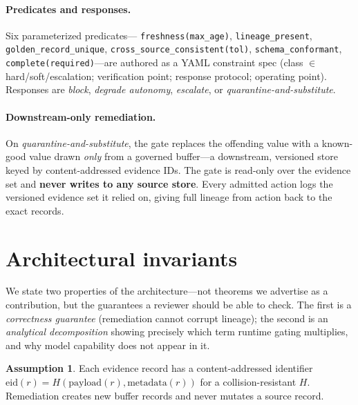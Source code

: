 \documentclass[11pt]{article}
\theoremstyle{plain}
\theoremstyle{definition}
\newtheorem{assumption}{Assumption}
\begin{document}
\paragraph{Predicates and responses.} Six parameterized predicates---%
\texttt{freshness(max\_age)}, \texttt{lineage\_present},
\texttt{golden\_record\_unique}, \texttt{cross\_source\_consistent(tol)},
\texttt{schema\_conformant}, \texttt{complete(required)}---are authored as a YAML
constraint spec (class $\in$ hard/soft/escalation; verification point; response
protocol; operating point). Responses are \emph{block}, \emph{degrade autonomy},
\emph{escalate}, or \emph{quarantine-and-substitute}.

\paragraph{Downstream-only remediation.} On \emph{quarantine-and-substitute}, the
gate replaces the offending value with a known-good value drawn \emph{only} from a
governed buffer---a downstream, versioned store keyed by content-addressed evidence
IDs. The gate is read-only over the evidence set and \textbf{never writes to any
source store}. Every admitted action logs the versioned evidence set it relied on,
giving full lineage from action back to the exact records.

\section{Architectural invariants}\label{sec:formal}
We state two properties of the architecture---not theorems we advertise as a
contribution, but the guarantees a reviewer should be able to check. The first is a
\emph{correctness guarantee} (remediation cannot corrupt lineage); the second is an
\emph{analytical decomposition} showing precisely which term runtime gating multiplies,
and why model capability does not appear in it.

\begin{assumption}\label{as:addr}
Each evidence record has a content-addressed identifier $\mathrm{eid}(r)=H(\text{payload}(r),\text{metadata}(r))$
for a collision-resistant $H$. Remediation creates new buffer records and never
mutates a source record.
\end{assumption}
\end{document}
